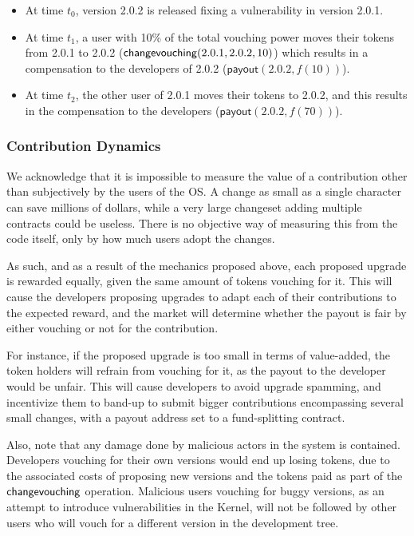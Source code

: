 \documentclass[]{article}
\makeatletter
\let\_\relax
\DeclareRobustCommand{\_}{%
  \leavevmode\vbox{%
    \hrule\@width.5em
          \@height-.26ex
          \@depth\dimexpr.26ex+.28pt\relax}}
\makeatother
\begin{document}
\begin{itemize}

  \item
    At time $t_0$, version 2.0.2 is released fixing a vulnerability in version
    2.0.1.

  \item
    At time $t_1$, a user with 10\% of the total vouching power moves their
    tokens from 2.0.1 to 2.0.2 ($\mathsf{change\_vouching}(2.0.1, 2.0.2, 10)$)
    which results in a compensation to the developers of 2.0.2
    ($\mathsf{payout}(2.0.2, f(10))$).

  \item
    At time $t_2$, the other user of 2.0.1 moves their tokens to 2.0.2, and this
    results in the compensation to the developers ($\mathsf{payout}(2.0.2, f(70))$).

\end{itemize}

\subsubsection{Contribution Dynamics}

We acknowledge that it is impossible to measure the value of a
contribution other than subjectively by the users of the OS. A change as
small as a single character can save millions of dollars, while a very
large changeset adding multiple contracts could be useless. There is no
objective way of measuring this from the code itself, only by how much
users adopt the changes.

As such, and as a result of the mechanics proposed above, each
proposed upgrade is rewarded equally, given the same amount of tokens
vouching for it. This will cause the developers proposing upgrades to
adapt each of their contributions to the expected reward, and the market
will determine whether the payout is fair by either vouching or not for
the contribution.

For instance, if the proposed upgrade is too small in terms of
value-added, the token holders will refrain from vouching for it, as the
payout to the developer would be unfair. This will cause developers to
avoid upgrade spamming, and incentivize them to band-up to submit bigger
contributions encompassing several small changes, with a payout address
set to a fund-splitting contract.

Also, note that any damage done by malicious actors in the system is
contained. Developers vouching for their own versions would end up
losing tokens, due to the associated costs of proposing new versions and
the tokens paid as part of the $\mathsf{change\_vouching}$ operation. Malicious
users vouching for buggy versions, as an attempt to
introduce vulnerabilities in the Kernel, will not be
followed by other users who will vouch for a different version in the
development tree.
\end{document}
